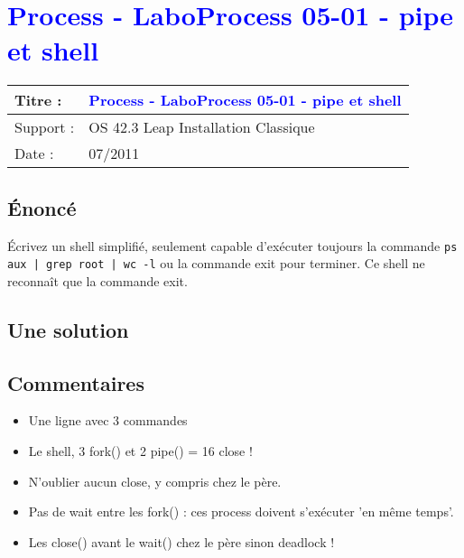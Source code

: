 \lstset{language=c}
\renewcommand{\titre}{\textcolor{blue}{ Process - LaboProcess 05-01 - pipe et shell }}

\lhead{ \titre }
\section{{\titre} }

\begin{tabular}{|l|l|}
\hline
Titre : 	& \titre \\\hline
Support : 	& OS 42.3 Leap Installation Classique \\\hline
Date :		& 07/2011 \\\hline
\end{tabular}

\subsection{Énoncé}

Écrivez un shell simplifié, seulement capable d'exécuter toujours la commande \verb+ps aux | grep root | wc -l+ ou la commande exit pour terminer. Ce shell ne reconnaît que la commande exit.

\subsection{Une solution}



\subsection{Commentaires}

\begin{itemize}
\item Une ligne avec 3 commandes
\item Le shell, 3 fork() et 2 pipe() = 16 close !
\item N'oublier aucun close, y compris chez le père.
\item Pas de wait entre les fork() : ces process doivent s'exécuter 'en même temps'.
\item Les close() avant le wait() chez le père sinon deadlock !
\end{itemize}
\newpage
